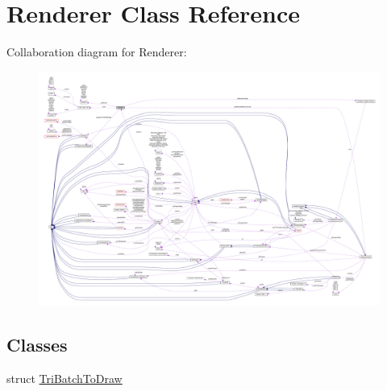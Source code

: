 \hypertarget{classRenderer}{}\section{Renderer Class Reference}
\label{classRenderer}


Collaboration diagram for Renderer\+:
\nopagebreak
\begin{figure}[H]
\begin{center}
\leavevmode
\includegraphics[width=350pt]{classRenderer__coll__graph}
\end{center}
\end{figure}
\subsection*{Classes}
\begin{DoxyCompactItemize}
\item 
struct \hyperlink{structRenderer_1_1TriBatchToDraw}{Tri\+Batch\+To\+Draw}
\end{DoxyCompactItemize}
